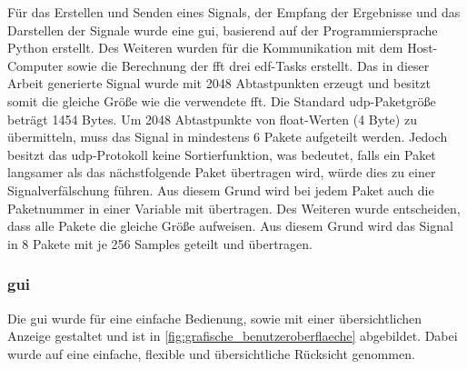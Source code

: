 \documentclass[../EDF Master Thesis.tex]{subfiles}
\begin{document}
        Für das Erstellen und Senden eines Signals, der Empfang der Ergebnisse und das Darstellen der Signale wurde eine \ac{gui}, basierend auf der Programmiersprache Python erstellt.
        Des Weiteren wurden für die Kommunikation mit dem Host-Computer sowie die Berechnung der \ac{fft} drei \ac{edf}-Tasks erstellt.
        Das in dieser Arbeit generierte Signal wurde mit 2048 Abtastpunkten erzeugt und besitzt somit die gleiche Größe wie die verwendete \ac{fft}.
        Die Standard \ac{udp}-Paketgröße beträgt 1454 Bytes.
        Um 2048 Abtastpunkte von float-Werten (4 Byte) zu übermitteln, muss das Signal in mindestens 6 Pakete aufgeteilt werden.
        Jedoch besitzt das \ac{udp}-Protokoll keine Sortierfunktion, was bedeutet, falls ein Paket langsamer als das nächstfolgende Paket übertragen wird, würde dies zu einer Signalverfälschung führen.
        Aus diesem Grund wird bei jedem Paket auch die Paketnummer in einer Variable mit übertragen.
        Des Weiteren wurde entscheiden, dass alle Pakete die gleiche Größe aufweisen.
        Aus diesem Grund wird das Signal in 8 Pakete mit je 256 Samples geteilt und übertragen.

        \clearpage

        \subsubsection{\acf{gui}}
            Die \ac{gui} wurde für eine einfache Bedienung, sowie mit einer übersichtlichen Anzeige gestaltet und ist in \autoref{fig:grafische_benutzeroberflaeche} abgebildet.
            Dabei wurde auf eine einfache, flexible und übersichtliche Rücksicht genommen.
\end{document}
